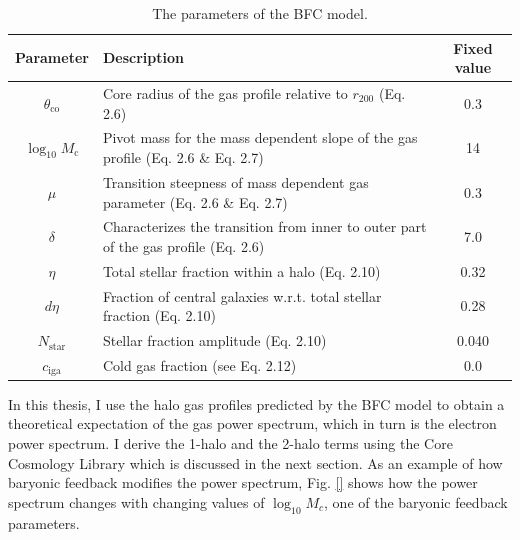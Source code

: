 \begin{table}[h]
\centering
\begin{tabular}{c p{6cm} c}
\hline\hline
\textbf{Parameter} & \textbf{Description} & \textbf{Fixed value} \\
\hline
$\theta_{\mathrm{co}}$ & Core radius of the gas profile relative to $r_{200}$ (Eq. 2.6) & 0.3 \\
$\log_{10} M_{\mathrm{c}}$ & Pivot mass for the mass dependent slope of the gas profile (Eq. 2.6 \& Eq. 2.7) & 14 \\
$\mu$ & Transition steepness of mass dependent gas parameter (Eq. 2.6 \& Eq. 2.7) & 0.3 \\
$\delta$ & Characterizes the transition from inner to outer part of the gas profile (Eq. 2.6) & 7.0 \\
$\eta$ & Total stellar fraction within a halo (Eq. 2.10) & 0.32 \\
$d\eta$ & Fraction of central galaxies w.r.t. total stellar fraction (Eq. 2.10) & 0.28 \\
$N_{\mathrm{star}}$ & Stellar fraction amplitude (Eq. 2.10) & 0.040 \\
$c_{\mathrm{iga}}$ & Cold gas fraction (see Eq. 2.12) & 0.0 \\
\hline\hline
\end{tabular}
\caption{The parameters of the BFC model.}
\label{tab:bfc_params}
\end{table}

In this thesis, I use the halo gas profiles predicted by the BFC model to obtain a theoretical expectation of the gas power spectrum, which in turn is the electron power spectrum. I derive the 1-halo and the 2-halo terms using the Core Cosmology Library which is discussed in the next section. As an example of how baryonic feedback modifies the power spectrum, Fig. \ref{} shows how the power spectrum changes with changing values of $\log_{10} M_c$, one of the baryonic feedback parameters.



